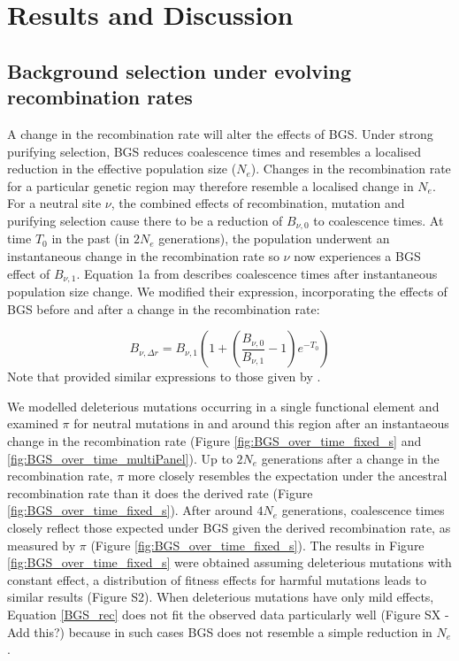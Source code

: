 \documentclass[11pt,twoside, onecolumn]{GSA_format}
\begin{document}
\section{Results and Discussion}

\subsection{Background selection under evolving recombination rates}

A change in the recombination rate will alter the effects of BGS. Under strong purifying selection, BGS reduces coalescence times and resembles a localised reduction in the effective population size ($N_e$). Changes in the recombination rate for a particular genetic region may therefore resemble a localised change in $N_e$. For a neutral site $\nu$, the combined effects of recombination, mutation and purifying selection cause there to be a reduction of $B_{\nu,0}$ to coalescence times. At time $T_0$ in the past (in $2N_e$ generations), the population underwent an instantaneous change in the recombination rate so $\nu$ now experiences a BGS effect of $B_{\nu,1}$. Equation 1a from \cite{Johri2020} describes coalescence times after instantaneous population size change. We modified their expression, incorporating the effects of BGS before and after a change in the recombination rate:

\begin{equation}
B_{\nu,\Delta r} = B_{\nu,1} ( 1 + (\frac{B_{\nu,0}}{B_{\nu,1}} - 1)e^{-T_0})
\label{BGS_rec}
\end{equation}
\noindent
Note that \cite{Pool2007} provided similar expressions to those given by \cite{Johri2020}.

\vspace{5px}
 

We modelled deleterious mutations occurring in a single functional element and examined $\pi$ for neutral mutations in and around this region after an instantaeous change in the recombination rate (Figure \ref{fig:BGS_over_time_fixed_s} and \ref{fig:BGS_over_time_multiPanel}). Up to $2N_e$ generations after a change in the recombination rate, $\pi$ more closely resembles the expectation under the ancestral recombination rate than it does the derived rate (Figure \ref{fig:BGS_over_time_fixed_s}). After around $4N_e$ generations, coalescence times closely reflect those expected under BGS given the derived recombination rate, as measured by $\pi$ (Figure \ref{fig:BGS_over_time_fixed_s}). The results in Figure \ref{fig:BGS_over_time_fixed_s} were obtained assuming deleterious mutations with constant effect, a distribution of fitness effects for harmful mutations leads to similar results (Figure S2). When deleterious mutations have only mild effects, Equation \ref{BGS_rec} does not fit the observed data particularly well (Figure SX - Add this?) because in such cases BGS does not resemble a simple reduction in $N_e$ \citep{Good2014, Cvijovic2018}. 
\end{document}

